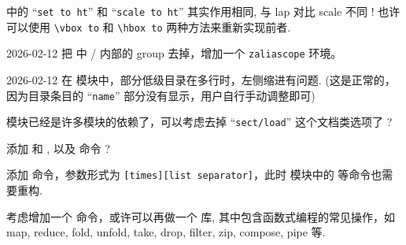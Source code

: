 \begin{todolist}
  \item *[目前缺少 lap 相关命令的实现, 原始的 ``\texttt{set to}'' 系命令的实现并无问题]  中的 ``\texttt{set to ht}'' 和 ``\texttt{scale to ht}'' 其实作用相同, 与 lap 对比 scale 不同 ! 也许可以使用 \verb|\vbox to| 和 \verb|\hbox to| 两种方法来重新实现前者.
  \item [2026-02-12] 把  中 \cmd{\zaliasOn}/\cmd{\zaliasOff} 内部的 group 去掉，增加一个 \texttt{zaliascope} 环境。
  \item [2026-02-12] 在  模块中，部分低级目录在多行时，左侧缩进有问题. (这是正常的，因为目录条目的 ``\texttt{name}'' 部分没有显示，用户自行手动调整即可)
  \item {} 模块已经是许多模块的依赖了，可以考虑去掉 ``\texttt{sect/load}'' 这个文档类选项了 ?
  \item 添加 \cmd{\ztexifmodload} 和 \cmd{\ztexiflibload}, 以及 \cmd{\ztexiffileload} 命令 ?
  \item 添加 \cmd{\zcmdmaplist} 命令，参数形式为 \texttt{[times][list separator]}，此时  模块中的  等命令也需要重构.
  \item 考虑增加一个 \cmd{\zcmdfilterlist} 命令，或许可以再做一个  库, 其中包含函数式编程的常见操作，如 map, reduce, fold, unfold, take, drop, filter, zip, compose, pipe 等.
\end{todolist}
